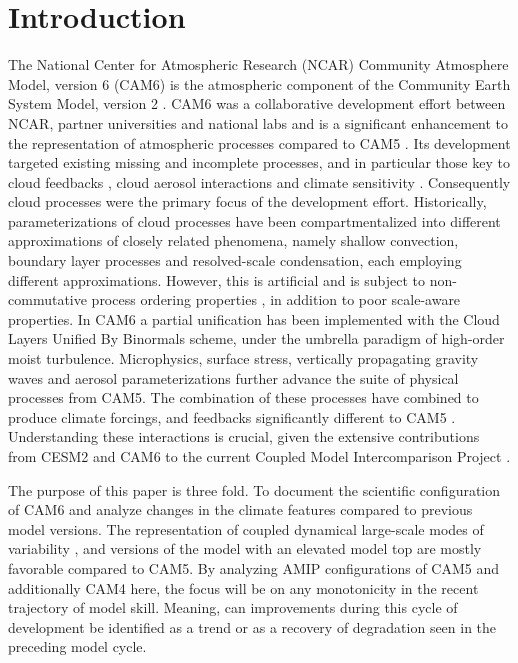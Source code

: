 \section{Introduction}
\label{sec:intro}

The National Center for Atmospheric Research (NCAR) Community Atmosphere Model, version 6 (CAM6) is the atmospheric component of the Community Earth System Model, version 2 \cite[CESM2,][]{Danabasoglu2020}. CAM6 was a collaborative development effort between NCAR, partner universities and national labs and is a significant enhancement to the representation of atmospheric processes compared to CAM5 \citep[][]{Neale2012}. Its development targeted existing missing and incomplete processes, and in particular those key to cloud feedbacks \citep{Webb2017}, cloud aerosol interactions \citep{Stevens2015} and climate sensitivity \citep{Zelinka2020}. Consequently cloud processes were the primary focus of the development effort. Historically, parameterizations of cloud processes have been compartmentalized into different approximations of closely related phenomena, namely shallow convection, boundary layer processes and resolved-scale condensation, each employing different approximations. However, this is artificial and is subject to non-commutative process ordering properties \citep{Donahue2018}, in addition to poor scale-aware properties. In CAM6 a partial unification has been implemented with the Cloud Layers Unified By Binormals \citep{Golaz2002,Golaz2002a} scheme, under the umbrella paradigm of high-order moist turbulence. Microphysics, surface stress, vertically propagating gravity waves and aerosol parameterizations further advance the suite of physical processes from CAM5. The combination of these processes have combined to produce climate forcings, and feedbacks significantly different to CAM5 \citep{Gettelman2019}. Understanding these interactions is crucial, given the extensive contributions from CESM2 and CAM6 to the current Coupled Model Intercomparison Project \citep[CMIP6, ][]{Eyring2016a}.

The purpose of this paper is three fold. To document the scientific configuration of CAM6 and analyze changes in the climate features compared to previous model versions. The representation of coupled dynamical large-scale modes of variability \citep{Simpson2020}, and versions of the model with an elevated model top \cite{Gettelman2019} are mostly favorable compared to CAM5. By analyzing AMIP configurations of CAM5 and additionally CAM4 \citep{Neale2013} here, the focus will be on any monotonicity in the recent trajectory of model skill. Meaning, can improvements during this cycle of development be identified as a trend or as a recovery of degradation seen in the preceding model cycle. 

